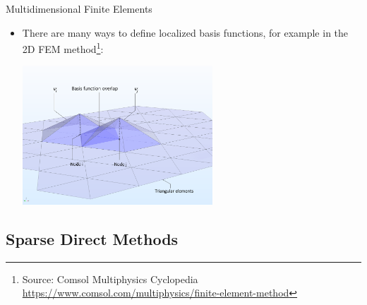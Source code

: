 \begin{frame}{Multidimensional Finite Elements}

\begin{itemize}
\item There are many ways to define localized basis functions, for example in the 2D FEM method\footnote{\tiny Source: Comsol Multiphysics Cyclopedia \url{https://www.comsol.com/multiphysics/finite-element-method}}:

{

\centering

\includegraphics[width=2.8in]{diagrams/base-functions-overlap}

}

\end{itemize}


\end{frame}



\subsection{Sparse Direct Methods}
%


